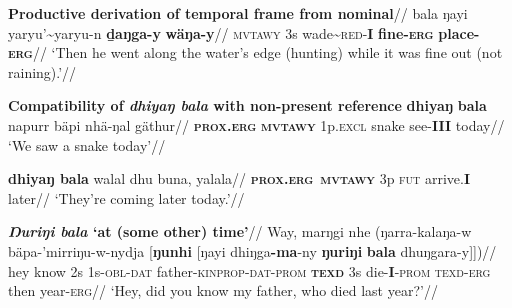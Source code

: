 \documentclass[11pt,dvipsnames]{article}
\newcommand{\gls}{\textsc}
\begin{document}
	\pex{}\begingl\glpreamble\textbf{Productive derivation of temporal frame from nominal}//
\gla bala ŋayi yaryu'\textasciitilde{yaryu}-n \textbf{ḏaŋga-y} \textbf{wäŋa-y}//
\glb \textsc{mvtawy} 3s wade\textasciitilde{\textsc{red}}-\textbf{I} \textbf{fine-\textsc{erg}} \textbf{place-\textsc{erg}}//
\glft`Then he went along the water's edge (hunting) while it was fine out (not raining).'//\endgl\xe

	
\pex\textbf{Compatibility of \textit{dhiyaŋ bala} with non-present reference}
\a\begingl\gla \textbf{dhiyaŋ} \textbf{bala} napurr bäpi nhä-ŋal gäthur//
\glb \textbf{\gls{prox}.\gls{erg}} \textbf{\gls{mvtawy}} 1p.\gls{excl} snake see-\textbf{III} today//
\glft`We saw a snake today'//\endgl

\a\begingl\gla \textbf{dhiyaŋ bala} walal dhu buna, yalala//
\glb \textbf{\gls{prox}.\gls{erg}}~\textbf{\gls{mvtawy}} 3p \gls{fut} arrive.\textbf{I} later//
\glft`They're coming later today.'//\endgl
\xe



\pex \begingl\glpreamble \textbf{\textit{Ŋuriŋi bala} `at (some other) time'}//
\gla Way, marŋgi nhe (ŋarra-kalaŋa-w bäpa-'mirriŋu-w-nydja [\textbf{ŋunhi} [ŋayi dhiŋga\textbf{-ma}-ny \textbf{ŋuriŋi} \textbf{bala} dhuŋgara-y]])//
\glb hey know 2s 1s-\gls{obl}-\gls{dat} father-\gls{kinprop}-\gls{dat}-\gls{prom} \textbf{\gls{texd}} 3s die-\textbf{I}-\gls{prom} \gls{texd}-\gls{erg} then year-\gls{erg}//
\glft`Hey, did you know my father, who died last year?'//\endgl\xe
\end{document}
